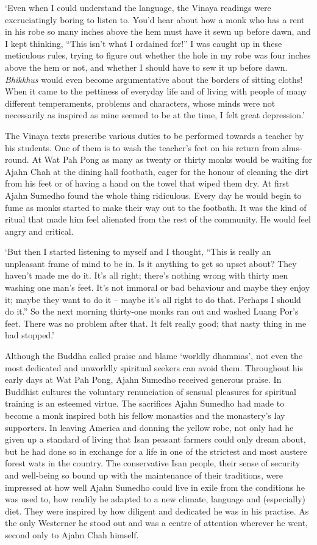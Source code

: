 `Even when I could understand the language, the Vinaya readings were
excruciatingly boring to listen to. You'd hear about how a monk who has a
rent in his robe so many inches above the hem must have it sewn up
before dawn, and I kept thinking, ``This isn't what I ordained for!'' I
was caught up in these meticulous rules, trying to figure out whether
the hole in my robe was four inches above the hem or not, and whether I
should have to sew it up before dawn. \emph{Bhikkhus} would even become
argumentative about the borders of sitting cloths! When it came to the
pettiness of everyday life and of living with people of many different
temperaments, problems and characters, whose minds were not necessarily
as inspired as mine seemed to be at the time, I felt great depression.'

The Vinaya texts prescribe various duties to be performed towards a
teacher by his students. One of them is to wash the teacher's feet on
his return from alms-round. At Wat Pah Pong as many as twenty or thirty
monks would be waiting for Ajahn Chah at the dining hall footbath, eager
for the honour of cleaning the dirt from his feet or of having a hand on
the towel that wiped them dry. At first Ajahn Sumedho found the whole
thing ridiculous. Every day he would begin to fume as monks started to
make their way out to the footbath. It was the kind of ritual that made
him feel alienated from the rest of the community. He would feel angry
and critical. 

`But then I started listening to myself and I thought, 
``This is really an unpleasant frame of mind to be in. Is it anything to
get so upset about? They haven't made me do it. It's all right; there's
nothing wrong with thirty men washing one man's feet. It's not immoral
or bad behaviour and maybe they enjoy it; maybe they want to do it --
maybe it's all right to do that. Perhaps I should do it.'' So the next
morning thirty-one monks ran out and washed Luang Por's feet. There was
no problem after that. It felt really good; that nasty thing in me had
stopped.'

Although the Buddha called praise and blame `worldly dhammas', not even
the most dedicated and unworldly spiritual seekers can avoid them. 
Throughout his early days at Wat Pah Pong, Ajahn Sumedho received
generous praise. In Buddhist cultures the voluntary renunciation of
sensual pleasures for spiritual training is an esteemed virtue. The
sacrifices Ajahn Sumedho had made to become a monk inspired both his
fellow monastics and the monastery's lay supporters. In leaving America
and donning the yellow robe, not only had he given up a standard of
living that Isan peasant farmers could only dream about, but he had done
so in exchange for a life in one of the strictest and most austere
forest wats in the country. The conservative Isan people, their sense of
security and well-being so bound up with the maintenance of their
traditions, were impressed at how well Ajahn Sumedho could live in exile
from the conditions he was used to, how readily he adapted to a new
climate, language and (especially) diet. They were inspired by how
diligent and dedicated he was in his practise. As the only Westerner he
stood out and was a centre of attention wherever he went, second only to
Ajahn Chah himself. 


